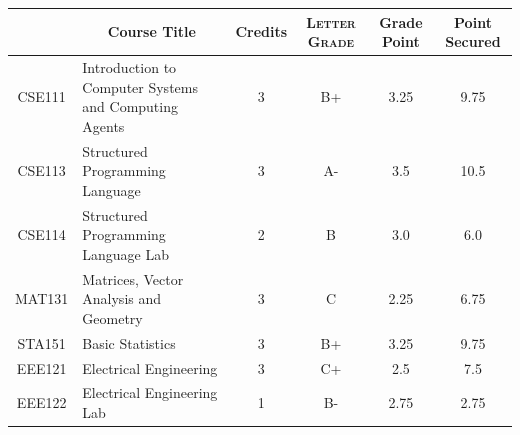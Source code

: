 \documentclass[11pt]{article}
\newcommand*{\numtwo}[1]{\pgfmathprintnumber[
                    fixed, precision=2, fixed zerofill=true]{#1}}
\begin{document}
                \begin{center}
                    \renewcommand{\arraystretch}{1.08}
                    
                \begin{tabular}{|c|l|c|>{\scshape}c|c|c|}
                \hline  \rule[-1ex]{0pt}{3.5ex} {\centering{\bf Course Code}} &  \multicolumn{1}{c|}{\textbf{Course Title}}  & {\bf Credits} & {\bf Letter Grade} & {\bf Grade Point} & {\bf Point Secured}  \\ 
                \hline   CSE111 &  Introduction to Computer Systems and Computing Agents		 & 3 & B+ & 3.25 & 9.75 \\ %
                \hline   CSE113 &  Structured Programming Language		 & 3 & A- & 3.5 & 10.5 \\ %
                \hline   CSE114 &  Structured Programming Language Lab		 & 2 & B & 3.0 & 6.0 \\ %
                \hline   MAT131 &  Matrices, Vector Analysis and Geometry		 & 3 & C & 2.25 & 6.75 \\ %
                \hline   STA151 &  Basic Statistics		 & 3 & B+ & 3.25 & 9.75 \\ %
                \hline   EEE121 &  Electrical Engineering		 & 3 & C+ & 2.5 & 7.5 \\ %
                \hline   EEE122 &  Electrical Engineering Lab		 & 1 & B- & 2.75 & 2.75 \\ %

\hline                %
                \end{tabular}
                \end{center}
                \renewcommand{\arraystretch}{1.03}
\end{document}
